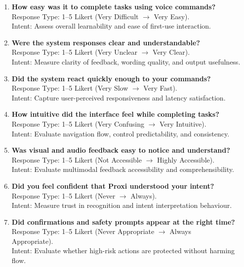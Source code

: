 \documentclass[12pt, titlepage]{article}
\begin{document}
\vspace{0.5em}
\begin{enumerate}

\item \textbf{How easy was it to complete tasks using voice commands?}\\
Response Type: 1--5 Likert (Very Difficult $\rightarrow$ Very Easy).\\
Intent: Assess overall learnability and ease of first-use interaction.

\item \textbf{Were the system responses clear and understandable?}\\
Response Type: 1--5 Likert (Very Unclear $\rightarrow$ Very Clear).\\
Intent: Measure clarity of feedback, wording quality, and output usefulness.

\item \textbf{Did the system react quickly enough to your commands?}\\
Response Type: 1--5 Likert (Very Slow $\rightarrow$ Very Fast).\\
Intent: Capture user-perceived responsiveness and latency satisfaction.

\item \textbf{How intuitive did the interface feel while completing tasks?}\\
Response Type: 1--5 Likert (Very Confusing $\rightarrow$ Very Intuitive).\\
Intent: Evaluate navigation flow, control predictability, and consistency.

\item \textbf{Was visual and audio feedback easy to notice and understand?}\\
Response Type: 1--5 Likert (Not Accessible $\rightarrow$ Highly Accessible).\\
Intent: Evaluate multimodal feedback accessibility and comprehensibility.

\item \textbf{Did you feel confident that Proxi understood your intent?}\\
Response Type: 1--5 Likert (Never $\rightarrow$ Always).\\
Intent: Measure trust in recognition and intent interpretation behaviour.

\item \textbf{Did confirmations and safety prompts appear at the right time?}\\
Response Type: 1--5 Likert (Never Appropriate $\rightarrow$ Always\\
Appropriate).\\
Intent: Evaluate whether high-risk actions are protected without harming flow.


\end{enumerate}
\end{document}
